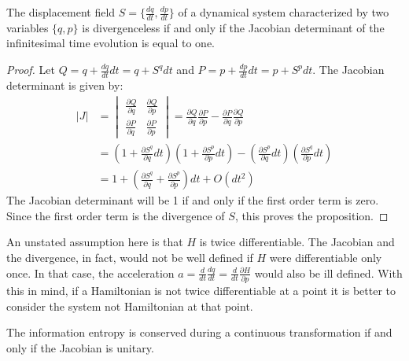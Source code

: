 \documentclass[10pt,twocolumn, nofootinbib]{revtex4-2}
\begin{document}
\begin{prop}
	The displacement field $S=\{\frac{dq}{dt}, \frac{dp}{dt} \}$ of a dynamical system characterized by two variables $\{q, p\}$ is divergenceless if and only if the Jacobian determinant of the infinitesimal time evolution is equal to one.
\end{prop}

\begin{proof}
	Let $Q = q + \frac{dq}{dt} dt = q + S^q dt$ and $P = p + \frac{dp}{dt} dt = p + S^p dt$. The Jacobian determinant is given by:
	\begin{align*}
		|J| &= \begin{vmatrix}
			\frac{\partial Q}{\partial q} & \frac{\partial Q}{\partial p} \\
			\frac{\partial P}{\partial q} & \frac{\partial P}{\partial  p} 
		\end{vmatrix} = \frac{\partial Q}{\partial q} \frac{\partial P}{\partial  p} - \frac{\partial P}{\partial q} \frac{\partial Q}{\partial p} \\
		&= \left(1 + \frac{\partial S^q}{\partial  q}dt\right)\left(1 + \frac{\partial S^p}{\partial  p}dt\right) - \left(\frac{\partial S^p}{\partial  q}dt\right)\left(\frac{\partial S^q}{\partial  p}dt\right) \\
		&= 1 + \left(\frac{\partial S^q}{\partial  q} + \frac{\partial S^p}{\partial  p}\right)dt + O(dt^2)
	\end{align*}
	The Jacobian determinant will be 1 if and only if the first order term is zero. Since the first order term is the divergence of $S$, this proves the proposition.	
\end{proof}

\begin{remark}
	An unstated assumption here is that $H$ is twice differentiable. The Jacobian and the divergence, in fact, would not be well defined if $H$ were differentiable only once. In that case, the acceleration $a = \frac{d}{dt}\frac{dq}{dt} = \frac{d}{dt} \frac{\partial H}{\partial p}$ would also be ill defined. With this in mind, if a Hamiltonian is not twice differentiable at a point it is better to consider the system not Hamiltonian at that point.
\end{remark}

\begin{prop}
	The information entropy is conserved during a continuous transformation if and only if the Jacobian is unitary.
\end{prop}
\end{document}
